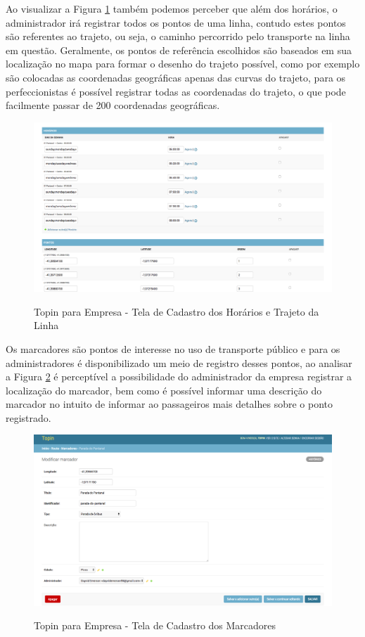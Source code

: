 {{{{{{{Ao visualizar a Figura \ref{fig:empresa-cadastro-horarios-trajeto} também podemos perceber que além dos horários, o administrador irá registrar todos os pontos de uma linha, contudo estes pontos são referentes ao trajeto, ou seja, o caminho percorrido pelo transporte na linha em questão. Geralmente, os pontos de referência escolhidos são baseados em sua localização no mapa para formar o desenho do trajeto possível, como por exemplo são colocadas as coordenadas geográficas apenas das curvas do trajeto, para os perfeccionistas é possível registrar todas as coordenadas do trajeto, o que pode facilmente passar de 200 coordenadas geográficas.

\begin{figure}[H]
\caption{Topin para Empresa - Tela de Cadastro dos Horários e Trajeto da Linha}
\centering
\includegraphics[width=1.0\textwidth]{imagens/cadastro-horarios-pontos.png}
\label{fig:empresa-cadastro-horarios-trajeto}
\end{figure}

Os marcadores são pontos de interesse no uso de transporte público e para os administradores é disponibilizado um meio de registro desses pontos, ao analisar a Figura \ref{fig:empresa-cadastro-ponto} é perceptível a possibilidade do administrador da empresa registrar a localização do marcador, bem como é possível informar uma descrição do marcador no intuito de informar ao passageiros mais detalhes sobre o ponto registrado.

\begin{figure}[H]
\caption{Topin para Empresa - Tela de Cadastro dos Marcadores}
\centering
\includegraphics[width=1.0\textwidth]{imagens/cadastro-ponto.png}
\label{fig:empresa-cadastro-ponto}
\end{figure}

}}}}}}}
